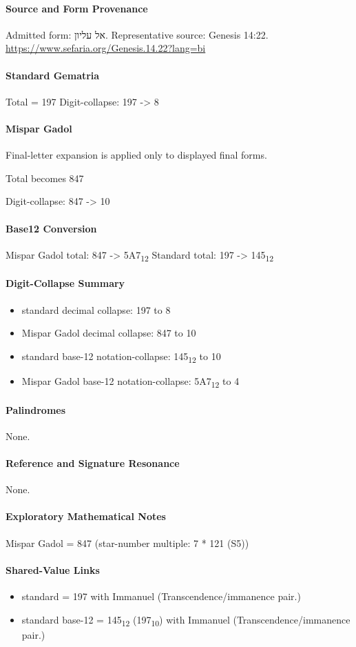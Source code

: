 \paragraph{Source and Form Provenance}
Admitted form: אל עליון.
Representative source: Genesis 14:22.
\url{https://www.sefaria.org/Genesis.14.22?lang=bi}
\paragraph{Standard Gematria}
Total = 197
Digit-collapse: 197 -> 8
\paragraph{Mispar Gadol}
Final-letter expansion is applied only to displayed final forms.

Total becomes 847

Digit-collapse: 847 -> 10
\paragraph{Base12 Conversion}
Mispar Gadol total: 847 -> 5A7\textsubscript{12}
Standard total: 197 -> 145\textsubscript{12}
\paragraph{Digit-Collapse Summary}
\begin{itemize}
\item standard decimal collapse: 197 to 8
\item Mispar Gadol decimal collapse: 847 to 10
\item standard base-12 notation-collapse: 145\textsubscript{12} to 10
\item Mispar Gadol base-12 notation-collapse: 5A7\textsubscript{12} to 4
\end{itemize}
\paragraph{Palindromes}
None.
\paragraph{Reference and Signature Resonance}
None.
\paragraph{Exploratory Mathematical Notes}
Mispar Gadol = 847 (star-number multiple: 7 * 121 (S5))
\paragraph{Shared-Value Links}
\begin{itemize}
\item standard = 197 with Immanuel (Transcendence/immanence pair.)
\item standard base-12 = 145\textsubscript{12} (197\textsubscript{10}) with Immanuel (Transcendence/immanence pair.)
\end{itemize}
